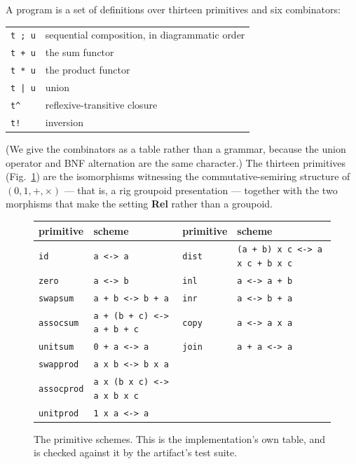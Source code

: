 \documentclass[runningheads,envcountsame]{llncs}
\newcommand{\Rel}{\textbf{Rel}}
\begin{document}
A program is a set of definitions over thirteen primitives and six combinators:
\begin{center}\small
\begin{tabular}{@{}ll@{}}
\texttt{t ; u} & sequential composition, in diagrammatic order \\
\texttt{t + u} & the sum functor \\
\texttt{t * u} & the product functor \\
\texttt{t | u} & union \\
\texttt{t\textasciicircum{}} & reflexive-transitive closure \\
\texttt{t!} & inversion \\
\end{tabular}
\end{center}
\noindent(We give the combinators as a table rather than a grammar, because the
union operator and BNF alternation are the same character.) The thirteen primitives (Fig.~\ref{fig:prims}) are the isomorphisms
witnessing the commutative-semiring structure of $(0,1,+,\times)$ --- that is, a
rig groupoid presentation --- together with the two morphisms that make the
setting \Rel{} rather than a groupoid.

\begin{figure}[t]
\centering\footnotesize
\begin{tabular}{@{}ll@{\qquad}ll@{}}
\hline
primitive & scheme & primitive & scheme \\
\hline
\texttt{id}        & \texttt{a <-> a}                    & \texttt{dist}   & \texttt{(a + b) x c <-> a x c + b x c} \\
\texttt{zero}      & \texttt{a <-> b}                    & \texttt{inl}    & \texttt{a <-> a + b} \\
\texttt{swapsum}   & \texttt{a + b <-> b + a}            & \texttt{inr}    & \texttt{a <-> b + a} \\
\texttt{assocsum}  & \texttt{a + (b + c) <-> a + b + c}  & \texttt{copy}   & \texttt{a <-> a x a} \\
\texttt{unitsum}   & \texttt{0 + a <-> a}                & \texttt{join}   & \texttt{a + a <-> a} \\
\texttt{swapprod}  & \texttt{a x b <-> b x a}            &                 & \\
\texttt{assocprod} & \texttt{a x (b x c) <-> a x b x c}  &                 & \\
\texttt{unitprod}  & \texttt{1 x a <-> a}                &                 & \\
\hline
\end{tabular}
\caption{The primitive schemes. This is the implementation's own table, and is
checked against it by the artifact's test suite.}
\label{fig:prims}
\end{figure}
\end{document}
